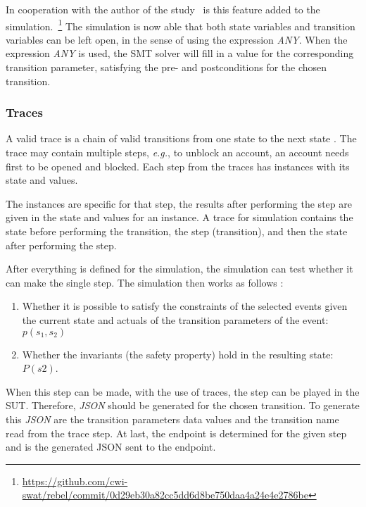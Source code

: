 In cooperation with the author of the study~\cite{stoel_storm_vinju_bosman_2016} is this feature added to the simulation.~\footnote{\url{https://github.com/cwi-swat/rebel/commit/0d29eb30a82cc5dd6d8be750daa4a24e4e2786be}}
The simulation is now able that both state variables and transition variables
can be left open, in the sense of using the expression \textit{ANY}. When the
expression \textit{ANY} is used, the SMT solver will fill in a value for the
corresponding transition parameter, satisfying the pre- and postconditions for
the chosen transition. 

\subsubsection*{Traces}
A valid trace is a chain of valid transitions from one state to the next state
\cite[p.5]{stoel_storm_vinju_bosman_2016}. The trace may contain multiple steps,
\textit{e.g.}, to unblock an account, an account needs first to be opened and
blocked. Each step from the traces has instances with its state and values.

The instances are specific
for that step, the results after performing the step are given in the state and
values for an instance. A trace for simulation contains the state before
performing the transition, the step (transition), and then the state after
performing the step.

After everything is defined for the simulation, the simulation can test whether
it can make the single step. The simulation then works as follows
\cite[p.6]{stoel_storm_vinju_bosman_2016}:
\begin{enumerate}
\item Whether it is possible to satisfy the constraints of the selected events
given the current state and actuals of the transition parameters of the event:
$p(s_{1}, s_{2})$
\item Whether the invariants (the safety property) hold in the resulting state:
$P(s2)$.
\end{enumerate}

When this step can be made, with the use of traces, the step can be played in
the SUT. Therefore, \textit{JSON} should be generated for the chosen transition.
To generate this \textit{JSON} are the transition parameters data values and
the transition name read from the trace step. At last, the endpoint is
determined for the given step and is the generated JSON sent to the endpoint.

